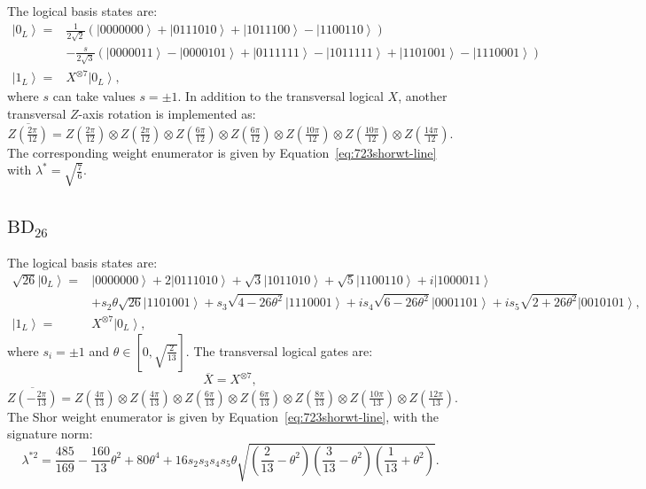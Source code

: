 \documentclass[8pt]{article}
\theoremstyle{definition}
\begin{document}
The logical basis states are:
\begin{align*}
    \left|0_{L}\right\rangle = & \frac{1}{2\sqrt{2}}\left(\left|0000000\right\rangle +\left|0111010\right\rangle +\left|1011100\right\rangle -\left|1100110\right\rangle \right)                                                          \\
                               & -\frac{s}{2\sqrt{3}}\left(\left|0000011\right\rangle -\left|0000101\right\rangle +\left|0111111\right\rangle -\left|1011111\right\rangle +\left|1101001\right\rangle -\left|1110001\right\rangle \right) \\
    \left|1_{L}\right\rangle = & X^{\otimes7}\left|0_{L}\right\rangle,
\end{align*}
where $s$ can take values $s=\pm 1$. In addition to the transversal logical \(X\), another transversal \(Z\)-axis rotation is implemented as:
\[ \overline{Z\left(\tfrac{2\pi}{12}\right)}=Z\left(\tfrac{2\pi}{12}\right)\otimes Z\left(\tfrac{2\pi}{12}\right)\otimes Z\left(\tfrac{6\pi}{12}\right)\otimes Z\left(\tfrac{6\pi}{12}\right)\otimes Z\left(\tfrac{10\pi}{12}\right)\otimes Z\left(\tfrac{10\pi}{12}\right)\otimes Z\left(\tfrac{14\pi}{12}\right). \]
The corresponding weight enumerator is given by Equation~\eqref{eq:723shorwt-line} with \(\lambda^* = \sqrt{\tfrac{7}{6}}\).

\subsection{\texorpdfstring{$\mathrm{BD}_{26}$}{BD₂₆}}

The logical basis states are:
\begin{align*}
    \sqrt{26}\left|0_{L}\right\rangle = & \left|0000000\right\rangle +2\left|0111010\right\rangle +\sqrt{3}\left|1011010\right\rangle +\sqrt{5}\left|1100110\right\rangle +i\left|1000011\right\rangle                                                         \\
                                        & +s_{2}\theta\sqrt{26}\left|1101001\right\rangle +s_{3}\sqrt{4-26\theta^{2}}\left|1110001\right\rangle +is_{4}\sqrt{6-26\theta^{2}}\left|0001101\right\rangle +is_{5}\sqrt{2+26\theta^{2}}\left|0010101\right\rangle, \\
    \left|1_{L}\right\rangle =          & X^{\otimes7}\left|0_{L}\right\rangle,
\end{align*}
where $s_i=\pm 1$ and $\theta\in\left[0,\sqrt{\tfrac{2}{13}}\right]$. The transversal logical gates are:
\[ \overline{X}=X^{\otimes7}, \]
\[ \overline{Z\left(-\tfrac{2\pi}{13}\right)}=Z\left(\tfrac{4\pi}{13}\right)\otimes Z\left(\tfrac{4\pi}{13}\right)\otimes Z\left(\tfrac{6\pi}{13}\right)\otimes Z\left(\tfrac{6\pi}{13}\right)\otimes Z\left(\tfrac{8\pi}{13}\right)\otimes Z\left(\tfrac{10\pi}{13}\right)\otimes Z\left(\tfrac{12\pi}{13}\right). \]
The Shor weight enumerator is given by Equation~\eqref{eq:723shorwt-line}, with the signature norm:
\[ \lambda^{*2}=\frac{485}{169}-\frac{160}{13}\theta^{2}+80\theta^{4}+16s_{2}s_{3}s_{4}s_{5}\theta\sqrt{\left(\frac{2}{13}-\theta^{2}\right)\left(\frac{3}{13}-\theta^{2}\right)\left(\frac{1}{13}+\theta^{2}\right)}. \]
\end{document}
